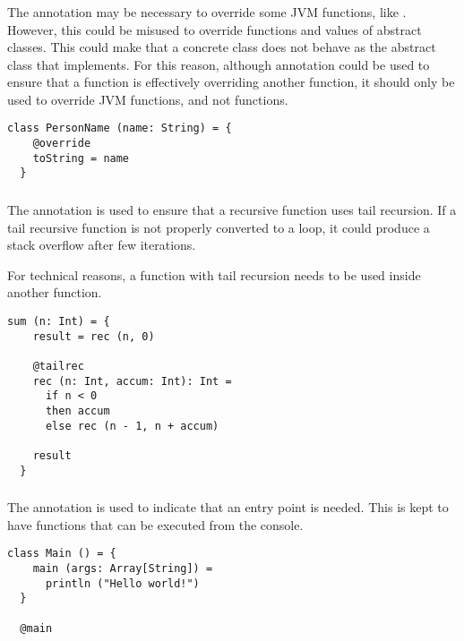 \subsubsection{\soverride}

The \soverride annotation may be necessary to override some JVM functions, like .
However, this could be misused to override functions and values of abstract classes.
This could make that a concrete class does not behave as the abstract class that implements.
For this reason, although \soverride annotation could be used to ensure that a function is effectively overriding another function, it should only be used to override JVM functions, and not \Soda functions.

\begin{lstlisting}[label={lst:exampleOverride}]
  class PersonName (name: String) = {
    @override
    toString = name
  }
\end{lstlisting}

\subsubsection{\stailrec}

The \stailrec annotation is used to ensure that a recursive function uses tail recursion.
If a tail recursive function is not properly converted to a loop, it could produce a stack overflow after few iterations.

For technical reasons, a function with tail recursion needs to be used inside another function.

\begin{lstlisting}[label={lst:exampleTailrecInside}]
  sum (n: Int) = {
    result = rec (n, 0)

    @tailrec
    rec (n: Int, accum: Int): Int =
      if n < 0
      then accum
      else rec (n - 1, n + accum)

    result
  }
\end{lstlisting}

\subsubsection{\smain}

The \smain annotation is used to indicate that an entry point is needed.
This is kept to have functions that can be executed from the console.

\begin{lstlisting}[label={lst:exampleMain}]
  class Main () = {
    main (args: Array[String]) =
      println ("Hello world!")
  }

  @main
\end{lstlisting}

